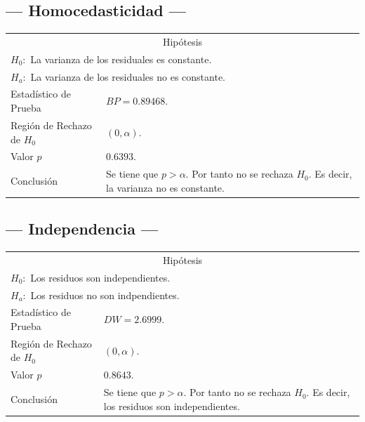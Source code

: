 \documentclass{article}
\begin{document}
\subsection{--- Homocedasticidad ---} %
\begin{center}
  \begin{tabular}{|l|p{8cm}|}
    \cline{1-2}
    \multicolumn{2}{|c|}{Hipótesis}\\ \cline{1-2}
    \multicolumn{2}{|l|}{\(H_0:\) La varianza de los residuales es constante.} \\ 
    \multicolumn{2}{|l|}{\(H_a:\) La varianza de los residuales no es constante.} \\ \cline{1-2}
    Estadístico de Prueba & \(BP = 0.89468\).\\ \cline{1-2} 
		Región de Rechazo de \(H_0\) & \((0, \alpha )\).\\ \cline{1-2} 
    Valor \(p\) & \(0.6393\).\\ \cline{1-2} 
    Conclusión & Se tiene que \(p> \alpha\). \newline 
		Por tanto no se rechaza \(H_0\). \newline 
		Es decir, la varianza no es constante. \\ \cline{1-2} 
  \end{tabular}
\end{center}

\subsection{--- Independencia ---} %
\begin{center}
  \begin{tabular}{|l|p{8cm}|}
    \cline{1-2}
    \multicolumn{2}{|c|}{Hipótesis}\\ \cline{1-2}
    \multicolumn{2}{|l|}{\(H_0:\) Los residuos son independientes.} \\ 
    \multicolumn{2}{|l|}{\(H_a:\) Los residuos no son indpendientes.} \\ \cline{1-2}
    Estadístico de Prueba & \(DW = 2.6999\).\\ \cline{1-2} 
		Región de Rechazo de \(H_0\) & \((0, \alpha )\).\\ \cline{1-2} 
    Valor \(p\) & \(0.8643\).\\ \cline{1-2} 
    Conclusión & Se tiene que \(p> \alpha\). \newline 
		Por tanto no se rechaza \(H_0\). \newline 
		Es decir, los residuos son independientes.\\ \cline{1-2} 
  \end{tabular}
\end{center}
\end{document}

